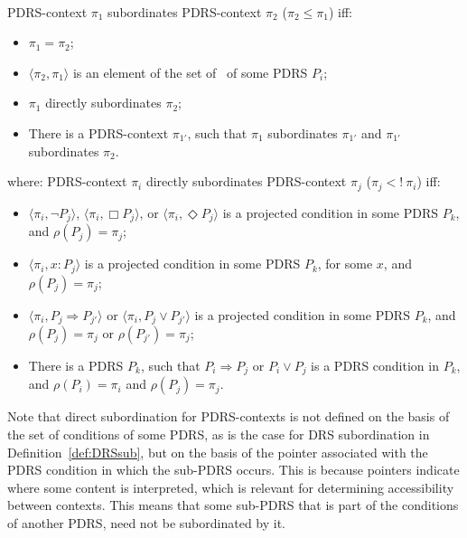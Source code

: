 \begin{definition}~\\
PDRS-context $\pi_1$ subordinates PDRS-context $\pi_2$ ($\pi_2 \leq \pi_1$)
iff:
\begin{itemize}
  \item $\pi_1 = \pi_2$;
  \item $\langle \pi_2,\pi_1\rangle$ is an element of the set of \MAPs~of some PDRS $P_i$;
  \item $\pi_1$ directly subordinates $\pi_2$;
  \item There is a PDRS-context $\pi_{1'}$, such that $\pi_1$ subordinates
    $\pi_{1'}$ and $\pi_{1'}$ subordinates $\pi_2$.
\end{itemize}
where: PDRS-context $\pi_i$ directly subordinates PDRS-context $\pi_j$ 
($\pi_j <!~\pi_i$) iff:
\begin{itemize}
  \item $\langle\pi_i,\neg P_j\rangle$,
    $\langle\pi_i,\Box P_j\rangle$,
    or $\langle\pi_i,\Diamond P_j\rangle$ is a projected condition in
    some PDRS $P_k$, and $\rho(P_j) = \pi_j$;
  \item $\langle\pi_i,x:P_j\rangle$ is a projected condition in some
    PDRS $P_k$, for some $x$, and $\rho(P_j) = \pi_j$;
  \item  $\langle\pi_i,P_j \Rightarrow P_{j'}\rangle$ or
    $\langle\pi_i,P_j \vee P_{j'}\rangle$ is a projected condition in
    some PDRS $P_k$, and $\rho(P_j) = \pi_j$ or $\rho(P_{j'}) = \pi_j$;
  \item There is a PDRS $P_k$, such that $P_i \Rightarrow P_j$ or 
    $P_i \vee P_j$ is a PDRS condition in $P_k$, and $\rho(P_i) = \pi_i$ 
    and $\rho(P_j) = \pi_j$. 
\end{itemize}
\end{definition}

\noindent Note that direct subordination for PDRS-contexts is not defined on
the basis of the set of conditions of some PDRS, as is the case for DRS
subordination in Definition~\ref{def:DRSsub}, but on the basis of the
pointer associated with the PDRS condition in which the sub-PDRS occurs.
This is because pointers indicate where some content is interpreted, which
is relevant for determining accessibility between contexts. This means that
some sub-PDRS that is part of the conditions of another PDRS, need not be
subordinated by it. 

